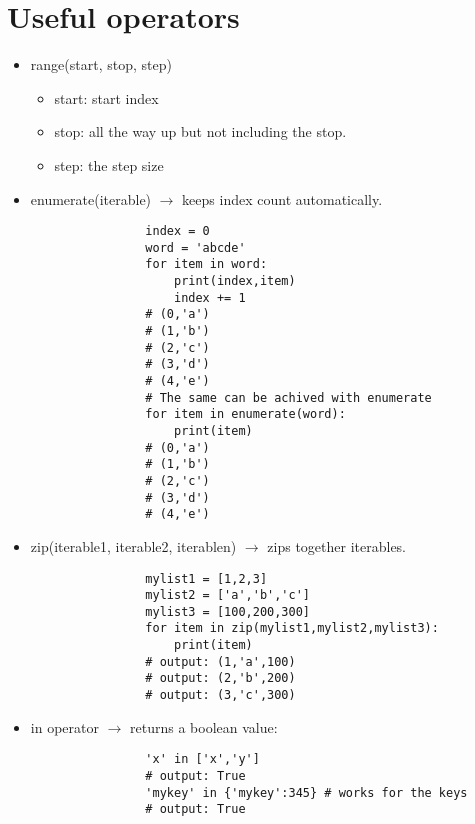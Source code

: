 \section{Useful operators}
\begin{itemize}
    \item range(start, stop, step)
        \begin{itemize}
            \item start: start index
            \item stop: all the way up but not including the stop. 
            \item step: the step size
        \end{itemize}
    
    \item enumerate(iterable) $\rightarrow$ keeps index count automatically. 
            \begin{verbatim}
                index = 0
                word = 'abcde'
                for item in word: 
                    print(index,item)
                    index += 1
                # (0,'a')
                # (1,'b')
                # (2,'c')
                # (3,'d')
                # (4,'e')
                # The same can be achived with enumerate 
                for item in enumerate(word):
                    print(item)
                # (0,'a')
                # (1,'b')
                # (2,'c')
                # (3,'d')
                # (4,'e')
            \end{verbatim}

    \item zip(iterable1, iterable2, iterablen) $\rightarrow$ zips together iterables. 
            \begin{verbatim}
                mylist1 = [1,2,3]
                mylist2 = ['a','b','c']
                mylist3 = [100,200,300]
                for item in zip(mylist1,mylist2,mylist3): 
                    print(item)
                # output: (1,'a',100)
                # output: (2,'b',200)
                # output: (3,'c',300)
            \end{verbatim}
    
    \item in operator $\rightarrow$ returns a boolean value: 
            \begin{verbatim}
                'x' in ['x','y']
                # output: True 
                'mykey' in {'mykey':345} # works for the keys 
                # output: True
            \end{verbatim}
    

\end{itemize}
